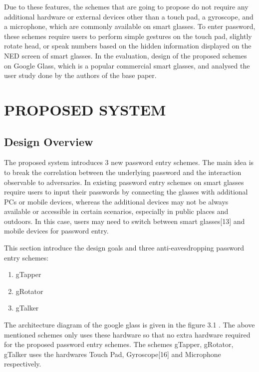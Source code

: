 \documentclass[12pt,a4paper,oneside]{report}
\begin{document}
\par
Due to these features, the  schemes that are going to propose do not require any
additional hardware or external devices other than a touch
pad, a gyroscope, and a microphone, which are commonly
available on smart glasses. To enter password, these schemes
require users to perform simple gestures on the touch pad,
slightly rotate head, or speak numbers based on the hidden
information displayed on the NED screen of smart glasses.
In the evaluation, design of the proposed schemes on
Google Glass, which is a popular commercial smart glasses,
and analysed the user study done by the authors of the base paper.


\chapter{PROPOSED SYSTEM}

\section{Design Overview}

\par
The proposed system introduces 3 new password entry schemes.  The main idea is to break the correlation between the underlying password and
the interaction observable to adversaries.
In existing password entry schemes on
smart glasses require users to input their passwords by connecting the glasses with additional PCs or mobile devices,
whereas the additional devices may not be always available or accessible in certain scenarios, especially in public
places and outdoors. In this case, users may need to switch
between smart glasses[13] and mobile devices for password entry.
\par
This section  introduce the design goals and three
anti-eavesdropping password entry schemes:
\begin{enumerate}
    \item gTapper
    \item gRotator
    \item gTalker
\end{enumerate} \newline
The architecture diagram of the google glass is given in the figure 3.1 . The above mentioned schemes only uses these hardware so that no extra hardware required for the proposed password entry schemes. The schemes gTapper, gRotator, gTalker uses the hardwares Touch Pad, Gyroscope[16] and Microphone respectively.
\end{document}
